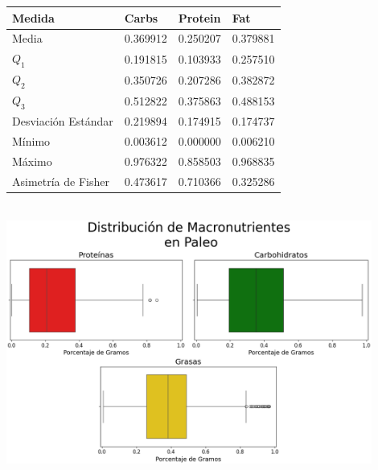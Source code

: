 \documentclass[12pt,a4paper]{article}
\begin{document}
{{{            \begin{center} 
                \begin{xtabular}{w{l}{}|lll}
                    \toprule
                        Medida & Carbs & Protein & Fat \\
                    \midrule
                        Media               & 0.369912 & 0.250207 & 0.379881 \\
                        $Q_1$               & 0.191815 & 0.103933 & 0.257510 \\
                        $Q_2$               & 0.350726 & 0.207286 & 0.382872 \\
                        $Q_3$               & 0.512822 & 0.375863 & 0.488153 \\
                        Desviación Estándar & 0.219894 & 0.174915 & 0.174737 \\
                        Mínimo              & 0.003612 & 0.000000 & 0.006210 \\
                        Máximo              & 0.976322 & 0.858503 & 0.968835 \\
                        Asimetría de Fisher & 0.473617 & 0.710366 & 0.325286 \\
                    \bottomrule
                \end{xtabular}\\
                \vspace{0.5cm}
                \includegraphics[width=0.9\textwidth]{Resources/EDA/Paleo_1.png}
            \end{center}       

}}}
\end{document}
